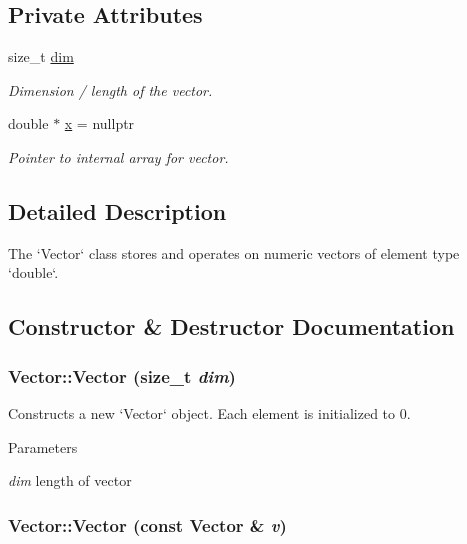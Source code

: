 \subsection*{Private Attributes}
\begin{DoxyCompactItemize}
\item 
size\_\-t \hyperlink{classcs1730_1_1Vector_a23747645c422e9fd5130a685d254ff09}{dim}
\begin{DoxyCompactList}\small\item\em Dimension / length of the vector. \item\end{DoxyCompactList}\item 
double $\ast$ \hyperlink{classcs1730_1_1Vector_a6f173a4fcd1f5a72580166efd39fc252}{x} = nullptr
\begin{DoxyCompactList}\small\item\em Pointer to internal array for vector. \item\end{DoxyCompactList}\end{DoxyCompactItemize}


\subsection{Detailed Description}
The `Vector` class stores and operates on numeric vectors of element type `double`. 

\subsection{Constructor \& Destructor Documentation}
\hypertarget{classcs1730_1_1Vector_a9eb37c1c544e3fa304b1a711e28b9ebe}{
\subsubsection[{Vector}]{\setlength{\rightskip}{0pt plus 5cm}Vector::Vector (size\_\-t {\em dim})}}
\label{classcs1730_1_1Vector_a9eb37c1c544e3fa304b1a711e28b9ebe}


Constructs a new `Vector` object. Each element is initialized to 0. 
\begin{DoxyParams}{Parameters}
\item[{\em dim}]length of vector \end{DoxyParams}
\hypertarget{classcs1730_1_1Vector_a5f04e343b7306ad11f8a82c89b486764}{
\subsubsection[{Vector}]{\setlength{\rightskip}{0pt plus 5cm}Vector::Vector (const {\bf Vector} \& {\em v})}}
\label{classcs1730_1_1Vector_a5f04e343b7306ad11f8a82c89b486764}


